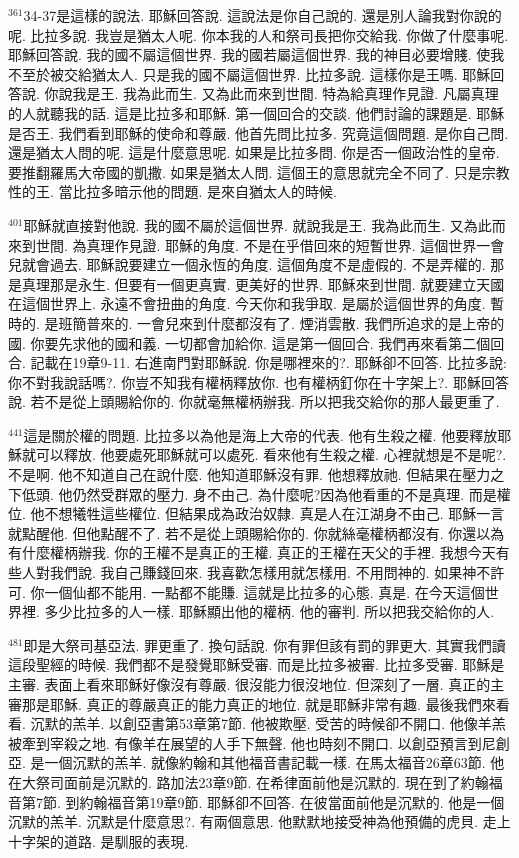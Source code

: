 \documentclass{book}
\begin{document}
$^{361}$34-37是這樣的說法.
耶穌回答說.
這說法是你自己說的.
還是別人論我對你說的呢.
比拉多說.
我豈是猶太人呢.
你本我的人和祭司長把你交給我.
你做了什麼事呢.
耶穌回答說.
我的國不屬這個世界.
我的國若屬這個世界.
我的神目必要增賤.
使我不至於被交給猶太人.
只是我的國不屬這個世界.
比拉多說.
這樣你是王嗎.
耶穌回答說.
你說我是王.
我為此而生.
又為此而來到世間.
特為給真理作見證.
凡屬真理的人就聽我的話.
這是比拉多和耶穌.
第一個回合的交談.
他們討論的課題是.
耶穌是否王.
我們看到耶穌的使命和尊嚴.
他首先問比拉多.
究竟這個問題.
是你自己問.
還是猶太人問的呢.
這是什麼意思呢.
如果是比拉多問.
你是否一個政治性的皇帝.
要推翻羅馬大帝國的凱撒.
如果是猶太人問.
這個王的意思就完全不同了.
只是宗教性的王.
當比拉多暗示他的問題.
是來自猶太人的時候.

$^{401}$耶穌就直接對他說.
我的國不屬於這個世界.
就說我是王.
我為此而生.
又為此而來到世間.
為真理作見證.
耶穌的角度.
不是在乎借回來的短暫世界.
這個世界一會兒就會過去.
耶穌說要建立一個永恆的角度.
這個角度不是虛假的.
不是弄權的.
那是真理那是永生.
但要有一個更真實.
更美好的世界.
耶穌來到世間.
就要建立天國在這個世界上.
永遠不會扭曲的角度.
今天你和我爭取.
是屬於這個世界的角度.
暫時的.
是班簡普來的.
一會兒來到什麼都沒有了.
煙消雲散.
我們所追求的是上帝的國.
你要先求他的國和義.
一切都會加給你.
這是第一個回合.
我們再來看第二個回合.
記載在19章9-11.
右進南門對耶穌說.
你是哪裡來的?.
耶穌卻不回答.
比拉多說:你不對我說話嗎?.
你豈不知我有權柄釋放你.
也有權柄釘你在十字架上?.
耶穌回答說.
若不是從上頭賜給你的.
你就毫無權柄辦我.
所以把我交給你的那人最更重了.

$^{441}$這是關於權的問題.
比拉多以為他是海上大帝的代表.
他有生殺之權.
他要釋放耶穌就可以釋放.
他要處死耶穌就可以處死.
看來他有生殺之權.
心裡就想是不是呢?.
不是啊.
他不知道自己在說什麼.
他知道耶穌沒有罪.
他想釋放祂.
但結果在壓力之下低頭.
他仍然受群眾的壓力.
身不由己.
為什麼呢?因為他看重的不是真理.
而是權位.
他不想犧牲這些權位.
但結果成為政治奴隸.
真是人在江湖身不由己.
耶穌一言就點醒他.
但他點醒不了.
若不是從上頭賜給你的.
你就絲毫權柄都沒有.
你還以為有什麼權柄辦我.
你的王權不是真正的王權.
真正的王權在天父的手裡.
我想今天有些人對我們說.
我自己賺錢回來.
我喜歡怎樣用就怎樣用.
不用問神的.
如果神不許可.
你一個仙都不能用.
一點都不能賺.
這就是比拉多的心態.
真是.
在今天這個世界裡.
多少比拉多的人一樣.
耶穌顯出他的權柄.
他的審判.
所以把我交給你的人.

$^{481}$即是大祭司基亞法.
罪更重了.
換句話說.
你有罪但該有罰的罪更大.
其實我們讀這段聖經的時候.
我們都不是發覺耶穌受審.
而是比拉多被審.
比拉多受審.
耶穌是主審.
表面上看來耶穌好像沒有尊嚴.
很沒能力很沒地位.
但深刻了一層.
真正的主審那是耶穌.
真正的尊嚴真正的能力真正的地位.
就是耶穌非常有趣.
最後我們來看看.
沉默的羔羊.
以創亞書第53章第7節.
他被欺壓.
受苦的時候卻不開口.
他像羊羔被牽到宰殺之地.
有像羊在展望的人手下無聲.
他也時刻不開口.
以創亞預言到尼創亞.
是一個沉默的羔羊.
就像約翰和其他福音書記載一樣.
在馬太福音26章63節.
他在大祭司面前是沉默的.
路加法23章9節.
在希律面前他是沉默的.
現在到了約翰福音第7節.
到約翰福音第19章9節.
耶穌卻不回答.
在彼當面前他是沉默的.
他是一個沉默的羔羊.
沉默是什麼意思?.
有兩個意思.
他默默地接受神為他預備的虎貝.
走上十字架的道路.
是馴服的表現.
\end{document}
